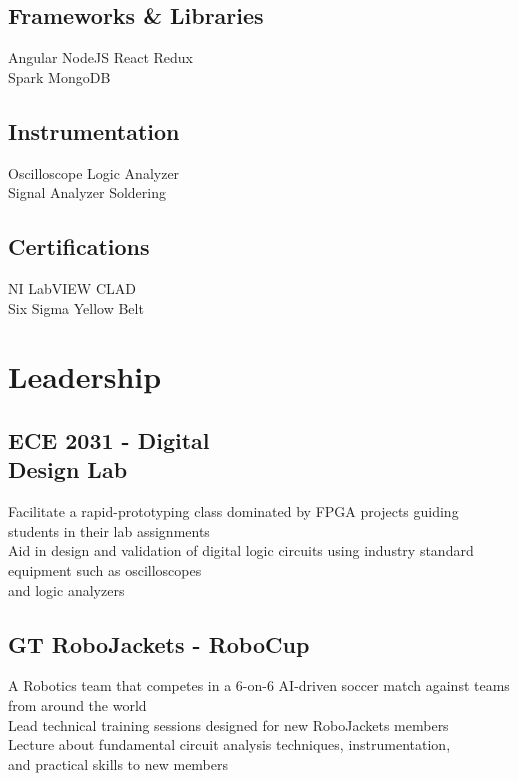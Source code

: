 \documentclass[]{deedy-resume-openfont}
\begin{document}
\begin{minipage}[t]{0.33\textwidth}
\subsection{Frameworks \& Libraries}
Angular \textbullet{} NodeJS \textbullet{} React \textbullet{} Redux \textbullet{} \\
Spark \textbullet{} MongoDB
\sectionsep

\subsection{Instrumentation}
Oscilloscope \textbullet{}  Logic Analyzer \textbullet{} \\  Signal Analyzer \textbullet{} Soldering
\sectionsep

\subsection{Certifications}
NI LabVIEW CLAD \textbullet{}\\ 
Six Sigma Yellow Belt

\section{Leadership}
\subsection{ECE 2031 - Digital \\ Design Lab}
\textbullet{} Facilitate a rapid-prototyping class dominated by FPGA projects guiding students in their lab assignments \\
\textbullet{} Aid in design and validation of digital logic circuits using industry standard equipment such as oscilloscopes \\ and logic analyzers
\sectionsep

\subsection{GT RoboJackets - RoboCup}
\textbullet{} A Robotics team that competes in a 6-on-6 AI-driven soccer match against teams from around the world \\
\textbullet{} Lead technical training sessions designed for new RoboJackets members \\
\textbullet{} Lecture about fundamental circuit analysis techniques, instrumentation, \\
and practical skills to new members 

\sectionsep

%
%

\end{minipage} 
\end{document}
